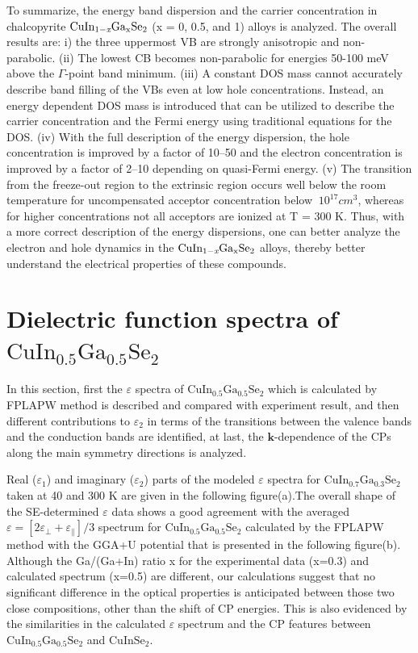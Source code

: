 \documentclass[a4paper, 12pt, titlepage,oneside,drop]{kthesis}
\begin{document}
To summarize, the energy band dispersion and the carrier concentration in chalcopyrite $\mathrm { CuIn_{1-\textit{x}}Ga_{x}Se_2}$ (x = 0, 0.5, and 1) alloys is analyzed. 
The overall results are: i) the three uppermost VB are strongly anisotropic and non-parabolic. (ii) The lowest CB becomes non-parabolic for energies 50-100 meV
above the $\Gamma$-point band minimum. (iii) A constant DOS mass cannot accurately describe band filling of the VBs even at low hole concentrations. Instead, 
an energy dependent DOS mass is introduced that can be utilized to describe the carrier concentration and the Fermi energy using traditional equations for the DOS.
(iv) With the full description of the energy dispersion, the hole concentration is improved by a factor of 10–50 and the electron concentration is improved by a 
factor of 2–10 depending on quasi-Fermi energy.  (v) The transition from the freeze-out region to the extrinsic region occurs well below the room temperature for
 uncompensated acceptor concentration below $~10^{17} cm^3$, whereas for higher concentrations not all acceptors are ionized at T = 300 K. 
Thus, with a more correct description of the energy dispersions, one can better analyze the electron and hole dynamics in the $\mathrm { CuIn_{1-\textit{x}}Ga_{x}Se_2}$ alloys, thereby better understand the electrical properties of these compounds.  


\section{Dielectric function spectra of $\mathrm {CuIn_{0.5}Ga_{0.5}Se_2}$ }
In this section, first the $\varepsilon$ spectra of $\mathrm {CuIn_{0.5}Ga_{0.5}Se_2}$ which is calculated by FPLAPW method is described and compared with experiment
result, and then different contributions to $\varepsilon_2$ in terms of the transitions between the valence bands and the conduction bands are identified, at last, 
the $\textbf{k}$-dependence of the CPs along the main symmetry directions is analyzed. 


Real ($\varepsilon_1$) and imaginary ($\varepsilon_2$) parts of the modeled $\varepsilon$ spectra for $\mathrm {CuIn_{0.7}Ga_{0.3}Se_2}$ taken at 40 and 300 K are given in the following
figure(a).The overall shape of the SE-determined $\varepsilon$ data shows a good agreement with the averaged $\varepsilon=[2\varepsilon_\perp+\varepsilon_\parallel]/3$ spectrum for $\mathrm {CuIn_{0.5}Ga_{0.5}Se_2}$ 
calculated by the FPLAPW method with the GGA+U potential that is presented in the following figure(b). Although the Ga/(Ga+In) ratio x for the experimental data
 (x=0.3) and calculated spectrum (x=0.5) are different, our calculations suggest that no significant difference in the optical properties is anticipated 
between those two close compositions, other than the shift of CP energies. This is also evidenced by the similarities in the calculated $\varepsilon$ spectrum and the CP 
features between $\mathrm {CuIn_{0.5}Ga_{0.5}Se_2}$ and $\mathrm {CuInSe_2}$.
\end{document}
